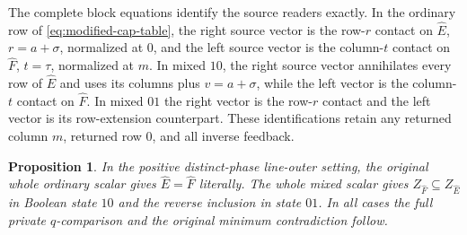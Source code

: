 \documentclass[11pt,a4paper]{amsart}
\numberwithin{equation}{section}
\theoremstyle{plain}
\newtheorem{proposition}[theorem]{Proposition}
\theoremstyle{definition}
\begin{document}
The complete block equations identify the source readers exactly.
In the ordinary row of \eqref{eq:modified-cap-table}, the right source
vector is the row-\(r\) contact on \(\widehat E\), \(r=a+\sigma\), normalized
at \(0\), and the left source vector is the column-\(t\) contact on
\(\widehat F\), \(t=\tau\), normalized at \(m\).
In mixed \(10\), the right source vector annihilates every row of
\(\widehat E\) and uses its columns plus \(v=a+\sigma\), while the left
vector is the column-\(t\) contact on \(\widehat F\).  In mixed \(01\) the
right vector is the row-\(r\) contact and the left vector is its
row-extension counterpart.  These identifications retain any returned
column \(m\), returned row \(0\), and all inverse feedback.

\begin{proposition}\label{prop:alternative-scalar}
In the positive distinct-phase line-outer setting, the original whole
ordinary scalar gives \(\widehat E=\widehat F\) literally.  The whole mixed
scalar gives \(Z_{\widehat F}\subseteq Z_{\widehat E}\) in Boolean state
\(10\) and the reverse inclusion in state \(01\).  In all cases the full
private \(q\)-comparison and the original minimum contradiction follow.
\end{proposition}
\end{document}
